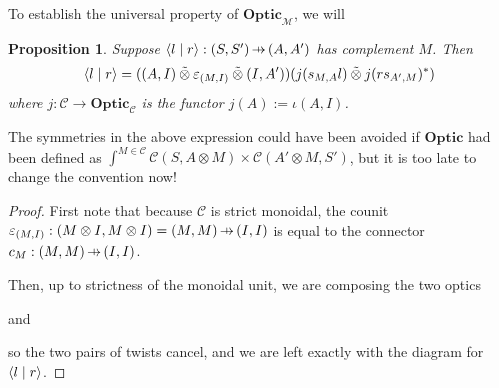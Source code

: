\documentclass[11pt,a4paper]{article}
\theoremstyle{plain}
\newtheorem{proposition}[theorem]{Proposition}
\theoremstyle{definition}
\newcommand{\C}{\mathscr{C}}
\newcommand{\M}{\mathscr{M}}
\newcommand{\Optic}{\mathbf{Optic}}
\newcommand{\switched}{\mathbin{\tilde{\otimes}}}
\newcommand{\rep}[2]{{\ensuremath \left\langle #1 \mid #2 \right\rangle}}
\newcommand{\hto}{\ensuremath{\,\mathaccent\shortmid\rightarrow\,}}
\begin{document}

To establish the universal property of $\Optic_\M$, we will 

\begin{proposition}\label{prop-optic-decompose}
  Suppose $\rep{l}{r} : (S, S') \hto (A, A')$ has complement $M$. Then
  \begin{align*}
    \rep{l}{r} = ((A, I) \switched \varepsilon_{(M, I)} \switched (I, A'))(j(s_{M,A}l) \switched j(rs_{A',M})^*)
  \end{align*}
  where $j : \C \to \Optic_\C$ is the functor $j(A) := \iota(A, I)$.
\end{proposition}
The symmetries in the above expression could have been avoided if $\Optic$ had been defined as $\int^{M \in \C} \C(S, A \otimes M) \times \C(A' \otimes M, S')$, but it is too late to change the convention now!
\begin{proof}
  First note that because $\C$ is strict monoidal, the counit $\varepsilon_{(M, I)} : (M \otimes I, M \otimes I) = (M, M) \hto (I, I)$ is equal to the connector $c_M : (M, M) \hto (I, I)$.

  Then, up to strictness of the monoidal unit, we are composing the two optics
  \begin{center}
    
  \end{center}
  and
  \begin{center}
    
  \end{center}
  so the two pairs of twists cancel, and we are left exactly with the diagram for $\rep{l}{r}$.
\end{proof}
\end{document}
